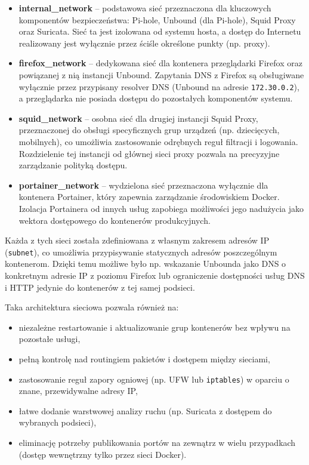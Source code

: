 \documentclass[
    left=2.5cm,         %
    right=2.5cm,        %
    top=2.5cm,          %
    bottom=3cm,         %
    bindingoffset=6mm,  %
    nohyphenation=true %
]{eiti/eiti-thesis} %
\begin{document}
\begin{itemize}
    \item \textbf{internal\_network} – podstawowa sieć przeznaczona dla kluczowych komponentów bezpieczeństwa: Pi-hole, Unbound (dla Pi-hole), Squid Proxy oraz Suricata. Sieć ta jest izolowana od systemu hosta, a dostęp do Internetu realizowany jest wyłącznie przez ściśle określone punkty (np. proxy).
    \item \textbf{firefox\_network} – dedykowana sieć dla kontenera przeglądarki Firefox oraz powiązanej z nią instancji Unbound. Zapytania DNS z Firefox są obsługiwane wyłącznie przez przypisany resolver DNS (Unbound na adresie \texttt{172.30.0.2}), a przeglądarka nie posiada dostępu do pozostałych komponentów systemu.
    \item \textbf{squid\_network} – osobna sieć dla drugiej instancji Squid Proxy, przeznaczonej do obsługi specyficznych grup urządzeń (np. dziecięcych, mobilnych), co umożliwia zastosowanie odrębnych reguł filtracji i logowania. Rozdzielenie tej instancji od głównej sieci proxy pozwala na precyzyjne zarządzanie polityką dostępu.
    \item \textbf{portainer\_network} – wydzielona sieć przeznaczona wyłącznie dla kontenera Portainer, który zapewnia zarządzanie środowiskiem Docker. Izolacja Portainera od innych usług zapobiega możliwości jego nadużycia jako wektora dostępowego do kontenerów produkcyjnych.
\end{itemize}

Każda z tych sieci została zdefiniowana z własnym zakresem adresów IP (\texttt{subnet}), co umożliwia przypisywanie statycznych adresów poszczególnym kontenerom. Dzięki temu możliwe było np. wskazanie Unbounda jako DNS o konkretnym adresie IP z poziomu Firefox lub ograniczenie dostępności usług DNS i HTTP jedynie do kontenerów z tej samej podsieci.

Taka architektura sieciowa pozwala również na:
\begin{itemize}
    \item niezależne restartowanie i aktualizowanie grup kontenerów bez wpływu na pozostałe usługi,
    \item pełną kontrolę nad routingiem pakietów i dostępem między sieciami,
    \item zastosowanie reguł zapory ogniowej (np. UFW lub \texttt{iptables}) w oparciu o znane, przewidywalne adresy IP,
    \item łatwe dodanie warstwowej analizy ruchu (np. Suricata z dostępem do wybranych podsieci),
    \item eliminację potrzeby publikowania portów na zewnątrz w wielu przypadkach (dostęp wewnętrzny tylko przez sieci Docker).
\end{itemize}
\end{document}
